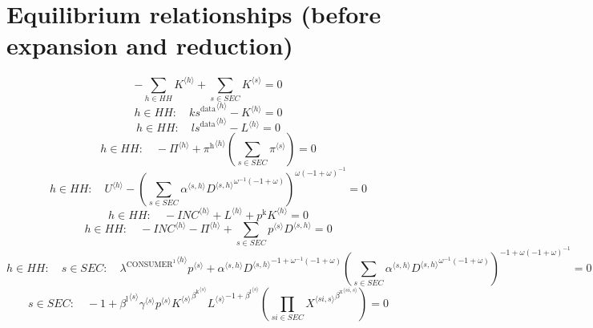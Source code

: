 \section{Equilibrium relationships (before expansion and reduction)}

\begin{equation}
-\sum_{h\in {H\!H}} {K}^{\langle h\rangle} + \sum_{s\in {S\!E\!C}} {K}^{\langle s\rangle} = 0
\end{equation}
\begin{equation}
h\in {H\!H}\colon\quad {{k\!s}^{\mathrm{data}}}^{\langle h\rangle} - {K}^{\langle h\rangle} = 0
\end{equation}
\begin{equation}
h\in {H\!H}\colon\quad {{l\!s}^{\mathrm{data}}}^{\langle h\rangle} - {L}^{\langle h\rangle} = 0
\end{equation}
\begin{equation}
h\in {H\!H}\colon\quad -{\Pi}^{\langle h\rangle} + {{\pi^{\mathrm{h}}}^{\langle h\rangle}} \left(\sum_{s\in {S\!E\!C}} {\pi}^{\langle s\rangle}\right) = 0
\end{equation}
\begin{equation}
h\in {H\!H}\colon\quad {U}^{\langle h\rangle} - \left(\sum_{s\in {S\!E\!C}} {{\alpha}^{\langle s,h\rangle}} {{{D}^{\langle s,h\rangle}}^{{\omega}^{-1} \left(-1 + \omega\right)}}\right)^{{\omega} \left(-1 + \omega\right)^{-1}} = 0
\end{equation}
\begin{equation}
h\in {H\!H}\colon\quad -{{I\!N\!C}}^{\langle h\rangle} + {L}^{\langle h\rangle} + {p^{\mathrm{k}}} {{K}^{\langle h\rangle}} = 0
\end{equation}
\begin{equation}
h\in {H\!H}\colon\quad -{{I\!N\!C}}^{\langle h\rangle} - {\Pi}^{\langle h\rangle} + \sum_{s\in {S\!E\!C}} {{p}^{\langle s\rangle}} {{D}^{\langle s,h\rangle}} = 0
\end{equation}
\begin{equation}
h\in {H\!H}\colon\quad s\in {S\!E\!C}\colon\quad {{\lambda^{\mathrm{CONSUMER}^{\mathrm{1}}}}^{\langle h\rangle}} {{p}^{\langle s\rangle}} + {{\alpha}^{\langle s,h\rangle}} {{{D}^{\langle s,h\rangle}}^{-1 + {\omega}^{-1} \left(-1 + \omega\right)}} {\left(\sum_{s\in {S\!E\!C}} {{\alpha}^{\langle s,h\rangle}} {{{D}^{\langle s,h\rangle}}^{{\omega}^{-1} \left(-1 + \omega\right)}}\right)^{-1 + {\omega} \left(-1 + \omega\right)^{-1}}} = 0
\end{equation}
\begin{equation}
s\in {S\!E\!C}\colon\quad -1 + {{\beta^{\mathrm{l}}}^{\langle s\rangle}} {{\gamma}^{\langle s\rangle}} {{p}^{\langle s\rangle}} {{{K}^{\langle s\rangle}}^{{\beta^{\mathrm{k}}}^{\langle s\rangle}}} {{{L}^{\langle s\rangle}}^{-1 + {\beta^{\mathrm{l}}}^{\langle s\rangle}}} \left(\prod_{{s\!i}\in {S\!E\!C}} {{X}^{\langle {s\!i},s\rangle}}^{{\beta^{\mathrm{x}}}^{\langle {s\!i},s\rangle}}\right) = 0
\end{equation}
